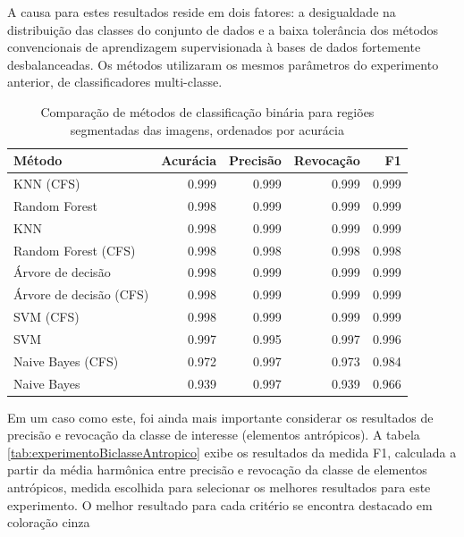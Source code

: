 A causa para estes resultados reside em dois fatores: a desigualdade na distribuição das classes do conjunto de dados e a baixa tolerância dos métodos convencionais de aprendizagem supervisionada à bases de dados fortemente desbalanceadas. Os métodos utilizaram os mesmos parâmetros do experimento anterior, de classificadores multi-classe.

\begin{table}[h]
\centering
	\begin{tabulary}{\linewidth}{|L|R|R|R|R|}
		\hline
		\textbf{Método} & \textbf{Acurácia} & \textbf{Precisão} & \textbf{Revocação} & \textbf{F1} \\ \hline
		KNN (CFS)               & 0.999 & 0.999 & 0.999 & 0.999 \\ \hline
		Random Forest           & 0.998 & 0.999 & 0.999 & 0.999 \\ \hline
		KNN                     & 0.998 & 0.999 & 0.999 & 0.999 \\ \hline
		Random Forest (CFS)     & 0.998 & 0.998 & 0.998 & 0.998 \\ \hline
		Árvore de decisão       & 0.998 & 0.999 & 0.999 & 0.999 \\ \hline
		Árvore de decisão (CFS) & 0.998 & 0.999 & 0.999 & 0.999 \\ \hline
		SVM (CFS)               & 0.998 & 0.999 & 0.999 & 0.999 \\ \hline
		SVM                     & 0.997 & 0.995 & 0.997 & 0.996 \\ \hline
		Naive Bayes (CFS)       & 0.972 & 0.997 & 0.973 & 0.984 \\ \hline
		Naive Bayes             & 0.939 & 0.997 & 0.939 & 0.966 \\ \hline
	\end{tabulary}
\caption{Comparação de métodos de classificação binária para regiões segmentadas das imagens, ordenados por acurácia}
\label{tab:experimentoBiclasse}
\end{table}

Em um caso como este, foi ainda mais importante considerar os resultados de precisão e revocação da classe de interesse (elementos antrópicos). A tabela \ref{tab:experimentoBiclasseAntropico} exibe os resultados da medida F1, calculada a partir da média harmônica entre precisão e revocação da classe de elementos antrópicos, medida escolhida para selecionar os melhores resultados para este experimento. O melhor resultado para cada critério se encontra destacado em coloração cinza

